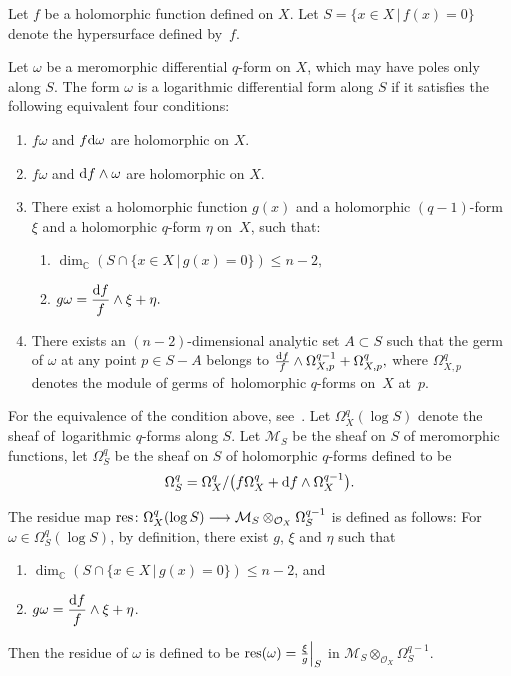 \documentclass[10pt,a4paper]{amsart}
\numberwithin{equation}{section}
\begin{document}
Let $f$ be a holomorphic function defined on $X$. Let $S=\{ x \in X \,|\, f(x)=0 \} $ denote the hypersurface defined by~$ f$.

\begin{Definition}\label{def1}
Let $\omega $ be a meromorphic differential $q$-form on $X$, which may have poles only along $S$. The form $\omega$ is a logarithmic differential form along $S$ if it satisfies the following equi\-valent four conditions:
\begin{enumerate}\itemsep=0pt
\item[$(i)$] $f\omega$ and $f{\rm d}\omega$ are holomorphic on $X$.
\item[$(ii)$] $f\omega$ and ${\rm d}f \wedge \omega$ are holomorphic on $X$.
\item[$(iii)$] There exist a holomorphic function $g(x)$ and a holomorphic $(q-1)$-form $\xi$ and a holomorphic $q$-form $\eta$ on~$X$,
such that:
\begin{enumerate}\itemsep=0pt
\item[$(a)$] $\dim_{\mathbb C}( S \cap \{x \in X \,|\, g(x)=0 \}) \leq n-2, $
\item[$(b)$] ${\displaystyle g\omega = \frac{{\rm d}f}{f} \wedge \xi + \eta.}$
\end{enumerate}
\item[$(iv)$] There exists an $ (n-2)$-dimensional analytic set $A \subset S$ such that the germ of $\omega$ at any point $ p \in S-A$ belongs to $ {\frac{{\rm d}f}{f} \wedge \Omega_{X, p}^{q-1} + \Omega_{X,p}^{q}},$ where $ \Omega_{X,p}^{q}$ denotes the module of germs of~holomorphic $q$-forms on~$X$ at~$p$.
\end{enumerate}
\end{Definition}


For the equivalence of the condition above, see~\cite{S}.
Let $\Omega_X^{q}(\log S)$ denote the sheaf of~loga\-rith\-mic $q$-forms along $S$.
Let ${\mathcal M}_{S}$ be the sheaf on $S$ of meromorphic functions, let $\Omega_{S}^{q}$ be the sheaf on $S$ of holomorphic $q$-forms defined to be
\begin{gather*}
\Omega_{S}^{q} = \Omega_{X}^{q}/\big(f\Omega_X^{q} + {\rm d}f\wedge \Omega_{X}^{q-1}\big).
\end{gather*}

\begin{Definition}
The residue map ${\rm res}\colon \Omega_X^{q}(\log S) \longrightarrow {\mathcal M}_S \otimes_{{\mathcal O}_X}\Omega_S^{q-1} $ is defined as follows: For~$\omega \in \Omega_S^{q}(\log S)$, by definition,
there exist $ g$, $\xi$ and $\eta$ such that
\begin{enumerate}\itemsep=0pt
\item[$(a)$] $\dim_{\mathbb C}( S \cap \{x \in X \,|\, g(x)=0 \}) \leq n-2$, and
\item[$(b)$] ${\displaystyle g\omega = \frac{{\rm d}f}{f} \wedge \xi + \eta}$.
\end{enumerate}
Then the residue of $\omega$ is defined to be
$ {\rm res}(\omega) = \frac{\xi}{g}\Big|_S$ in $ {\mathcal M}_S \otimes_{{\mathcal O}_X}\Omega_S^{q-1}$.
\end{Definition}
\end{document}
